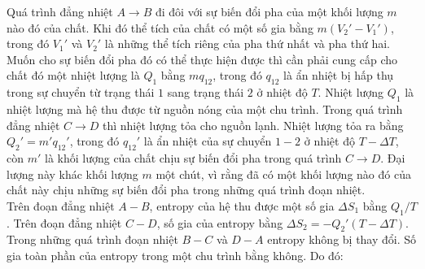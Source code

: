 Quá trình đẳng nhiệt $A \to B$ đi đôi với sự biến đổi pha của một khối lượng $m$ nào đó của chất. Khi đó thể tích của chất có một số gia bằng $m(V_2'-V_1')$, trong đó $V_1'$ và $V_2'$ là những thể tích riêng của pha thứ nhất và pha thứ hai. Muốn cho sự biến đổi pha đó có thể thực hiện được thì cần phải cung cấp cho chất đó một nhiệt lượng là $Q_1$ bằng $mq_{12}$, trong đó $q_{12}$ là ẩn nhiệt bị hấp thụ trong sự chuyển từ trạng thái $1$ sang trạng thái $2$ ở nhiệt độ $T$. Nhiệt lượng $Q_1$ là nhiệt lượng mà hệ thu được từ nguồn nóng của một chu trình. Trong quá trình đẳng nhiệt $C \to D$ thì nhiệt lượng tỏa cho nguồn lạnh. Nhiệt lượng tỏa ra bằng $Q_2'=m'q_{12}'$, trong đó $q_{12}'$ là ẩn nhiệt của sự chuyển $1-2$ ở nhiệt độ $T-\Delta T$, còn $m'$ là khối lượng của chất chịu sự biến đổi pha trong quá trình $C \to D$. Đại lượng này khác khối lượng $m$ một chút, vì rằng đã có một khối lượng nào đó của chất này chịu những sự biến đổi pha trong những quá trình đoạn nhiệt.\\

Trên đoạn đẳng nhiệt $A-B$, entropy của hệ thu được một số gia $\Delta S_1$  bằng $Q_1/T$. Trên đoạn đẳng nhiệt $C-D$, số gia của entropy bằng $\Delta S_2=-Q_2'(T-\Delta T)$. Trong những quá trình đoạn nhiệt $B-C$ và $D-A$ entropy không bị thay đổi. Số gia toàn phần của entropy trong một chu trình bằng không. Do đó:

